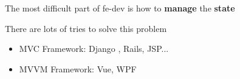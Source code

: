 \begin{frame}

    The most difficult part of fe-dev is how to \textbf{manage} the \textbf{state}

    There are lots of tries to solve  this problem

    \begin{itemize}
        \item MVC Framework: Django , Rails, JSP...
        \item MVVM Framework: Vue, WPF
    \end{itemize}

\end{frame}